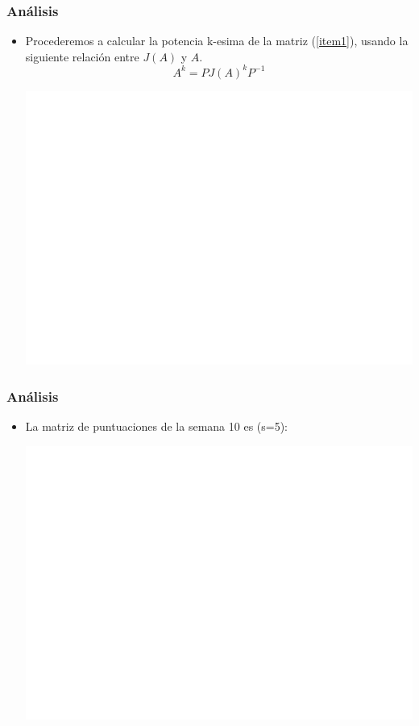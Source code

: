 \documentclass[utf8,spanish,xcolor={svgnames},12pt,handout]{beamer}
\begin{document}
\begin{frame}
	\frametitle{Análisis}
	\begin{itemize}
		\item Procederemos a calcular la potencia k-esima de la matriz  (\ref{item1}), usando la siguiente relación entre $J(A)$ y $A$.
		$$A^{k} = PJ(A)^{k}P^{-1}$$
			\begin{center}
				\includegraphics[page=2, trim= 4cm 2cm 0cm 4cm ,clip,scale=0.36]{MatrixSimb}
			\end{center}
	\end{itemize}
\end{frame}

\begin{frame}
	\frametitle{Análisis}
	\begin{itemize}
			\item La matriz de puntuaciones de la semana  10 es (s=5):
			\begin{center}
				\includegraphics[page=3,trim= 4.3cm 4cm 4cm 4cm, clip, scale=0.5]{MatrixSimb}
			\end{center}
	\end{itemize}
\end{frame}
\end{document}
